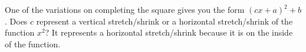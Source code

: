 {One of the variations on completing the square gives you the form $(cx+a)^2+b$. Does $c$ represent a vertical stretch/shrink or a horizontal stretch/shrink of the function $x^2$?}
{It represents a horizontal stretch/shrink because it is on the inside of the function.}
